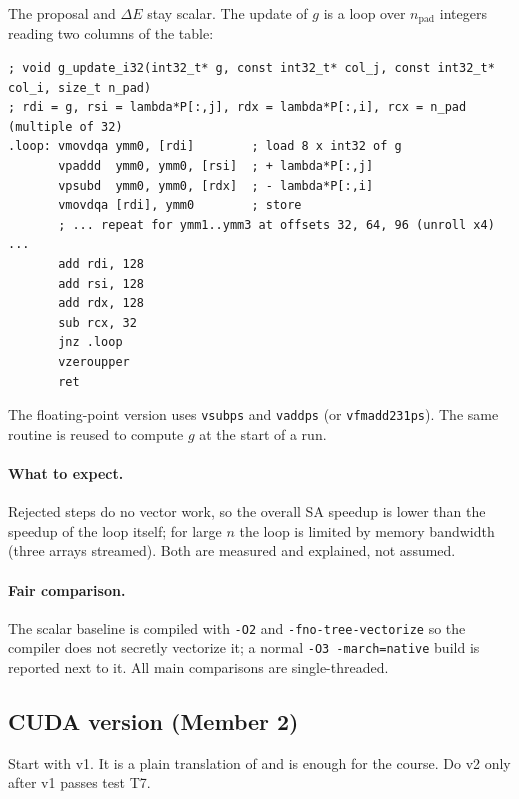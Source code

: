 The proposal and $\Delta E$ stay scalar. The update of $g$ is a loop over $n_{\text{pad}}$ integers reading two columns of the table:
\begin{lstlisting}
; void g_update_i32(int32_t* g, const int32_t* col_j, const int32_t* col_i, size_t n_pad)
; rdi = g, rsi = lambda*P[:,j], rdx = lambda*P[:,i], rcx = n_pad (multiple of 32)
.loop: vmovdqa ymm0, [rdi]        ; load 8 x int32 of g
       vpaddd  ymm0, ymm0, [rsi]  ; + lambda*P[:,j]
       vpsubd  ymm0, ymm0, [rdx]  ; - lambda*P[:,i]
       vmovdqa [rdi], ymm0        ; store
       ; ... repeat for ymm1..ymm3 at offsets 32, 64, 96 (unroll x4) ...
       add rdi, 128
       add rsi, 128
       add rdx, 128
       sub rcx, 32
       jnz .loop
       vzeroupper
       ret
\end{lstlisting}
The floating-point version uses \texttt{vsubps} and \texttt{vaddps} (or \texttt{vfmadd231ps}). The same routine is reused to compute $g$ at the start of a run.

\paragraph{What to expect.} Rejected steps do no vector work, so the overall SA speedup is lower than the speedup of the loop itself; for large $n$ the loop is limited by memory bandwidth (three arrays streamed). Both are measured and explained, not assumed.

\paragraph{Fair comparison.} The scalar baseline is compiled with \texttt{-O2} and \texttt{-fno-tree-vectorize} so the compiler does not secretly vectorize it; a normal \texttt{-O3 -march=native} build is reported next to it. All main comparisons are single-threaded.

\subsection{CUDA version (Member 2)}

Start with v1. It is a plain translation of  and is enough for the course. Do v2 only after v1 passes test T7.

